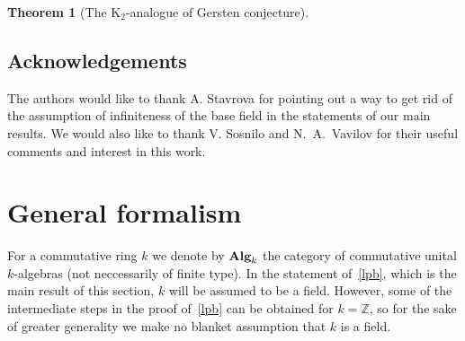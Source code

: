 \documentclass[oneside, 11pt]{amsart} \pdfoutput=1
\newcommand{\K}{{\mathrm{K}}}
\numberwithin{equation}{section}
\newtheorem{theorem}[lemma]{Theorem}
\theoremstyle{definition}
\newcommand{\ZZ}{\mathbb{Z}}
\newcommand{\catname}[1]{{\normalfont\textbf{#1}}} %
\begin{document}
\begin{theorem}[The $\K_2$-analogue of Gersten conjecture]

\end{theorem}

\subsection{Acknowledgements} The authors would like to thank A. Stavrova for pointing out a way to get rid of the assumption of infiniteness of the base field in the statements of our main results. We would also like to thank V. Sosnilo and N.~A.~Vavilov for their useful comments and interest in this work.


\section{General formalism}
\begin{comment}
The aim of this section is to formulate and prove Lindel--Popescu Theorem, a certain formal statement, which gives a sufficient condition for a general group-valued functor to be homotopy invariant. Later, in~\cref{sec:main} this result is applied to the functor $K_2$. Some of the machinery developed in this section also will be useful in the study of the $K_2$-analogue of Gersten's conjecture, see~\cref{sec:K2-GC}.

Let us briefly recall the historical context, which might help to explain our choice of the name for~\cref{lpb}. Recall that H.~Lindel's paper~\cite{Li81} has settled the geometric case of the Bass--Quillen conjecture for all regular $k$-algebras $R$ essentially of finite type over $k$. Later T.~Vorst has used Lindel's result in the proof of the homotopy invariance for the unstable $\K_1$-functor, see~\cite{Vo81}. Recall that Vorst's result asserts that $\K_{1,r}(R[t]) \cong \K_{1,r}(R)$ for $r\geq 3$ and a regular ring $R$ essentially finite type over a field. Next, D.~Popescu proved Bass--Quillen conjecture in equicharacteristic case~\cite{Po90}.  Finally, in her recent work~\cite{Sta14} A.~Stavrova has combined Vorst's theorem with a theorem of Popescu and obtained a more general homotopy invariance $\K_1^G(A[t]) \cong \K_1^G(A)$ for an arbitrary regular algebra $A$ over a perfect field $F$ and a sufficiently isotropic reductive group $G$ defined over $F$, see~\cite[Theorem~1.3]{Sta14}.

\subsection{A general Lindel--Popescu-type theorem}
\end{comment}
For a commutative ring $k$ we denote by $\catname{Alg}_k$ the category of commutative unital $k$-algebras (not neccessarily of finite type). In the statement of~\cref{lpb}, which is the main result of this section, $k$ will be assumed to be a field. However, some of the intermediate steps in the proof of~\cref{lpb} can be obtained for $k=\ZZ$, so for the sake of greater generality we make no blanket assumption that $k$ is a field.  
\end{document}
